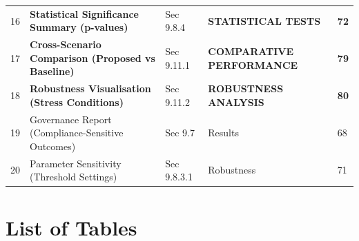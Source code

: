 \documentclass[11pt]{article}
\begin{document}
\begin{longtable}{C{1cm}L{7.8cm}L{2.1cm}L{2.1cm}C{1cm}}
16 & \textbf{Statistical Significance Summary (p-values)} & Sec 9.8.4 & \textbf{STATISTICAL TESTS} & \textbf{72} \\
17 & \textbf{Cross-Scenario Comparison (Proposed vs Baseline)} & Sec 9.11.1 & \textbf{COMPARATIVE PERFORMANCE} & \textbf{79} \\
18 & \textbf{Robustness Visualisation (Stress Conditions)} & Sec 9.11.2 & \textbf{ROBUSTNESS ANALYSIS} & \textbf{80} \\
19 & Governance Report (Compliance-Sensitive Outcomes) & Sec 9.7 & Results & 68 \\
20 & Parameter Sensitivity (Threshold Settings) & Sec 9.8.3.1 & Robustness & 71 \\
\bottomrule
\end{longtable}
\normalsize

\clearpage
\section*{List of Tables}
\small
\end{document}
